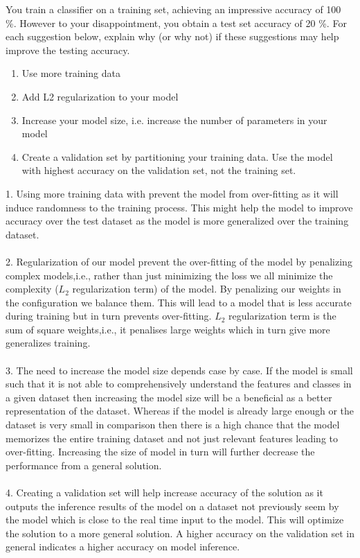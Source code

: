 \documentclass[answers]{exam}
\begin{document}
You train a classifier on a training set, achieving an impressive accuracy of 100 \%. However to your disappointment, you obtain a test set accuracy of 20 \%.  For each suggestion below, explain why (or why not) if these suggestions may help improve the testing accuracy.
\begin{enumerate}
    \item Use more training data
    \item Add L2 regularization to your model
    \item Increase your model size, i.e. increase the number of parameters in your model
    \item Create a validation set by partitioning your training data. Use the model with highest accuracy on the validation set, not the training set. 
\end{enumerate}

\begin{solution}
1. Using more training data with prevent the model from over-fitting as it will induce randomness to the training process. This might help the model to improve accuracy over the test dataset as the model is more generalized over the training dataset.\\
\\
2. Regularization of our model prevent the over-fitting of the model by penalizing complex models,i.e., rather than just minimizing the loss we all minimize the complexity ($L_2$ regularization term) of the model. By penalizing our weights in the configuration we balance them. This will lead to a model that is less accurate during training but in turn prevents over-fitting. $L_2$ regularization term is the sum of square weights,i.e., it penalises large weights which in turn give more generalizes training.\\
\\
3. The need to increase the model size depends case by case. If the model is small such that it is not able to comprehensively understand the features and classes in a given dataset then increasing the model size will be a beneficial as a better representation of the dataset. Whereas if the model is already large enough or the dataset is very small in comparison then there is a high chance that the model memorizes the entire training dataset and not just relevant features leading to over-fitting. Increasing the size of model in turn will further decrease the performance from a general solution.\\
\\
4. Creating a validation set will help increase accuracy of the solution as it outputs the inference results of the model on a dataset not previously seem by the model which is close to the real time input to the model. This will optimize the solution to a more general solution. A higher accuracy on the validation set in general indicates a higher accuracy on model inference.


\end{solution}
\end{document}
